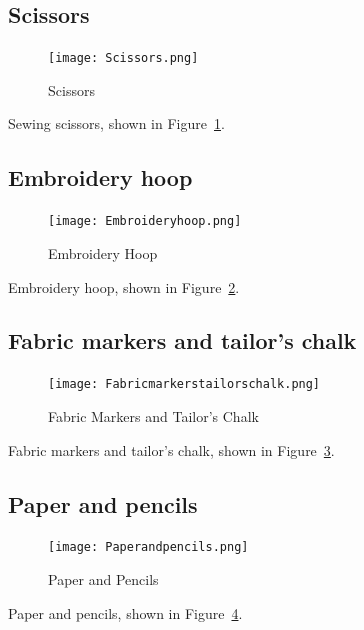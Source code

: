 \documentclass[letterpaper,twoside,12pt]{article}
\begin{document}
\subsection{Scissors}
\begin{figure}[hbpt]\begin{centering}%
\texttt{[image: Scissors.png]}
\caption{Scissors}
\label{fig:scissors}
\end{centering}\end{figure}
Sewing scissors, shown in Figure~\ref{fig:scissors}.
\clearpage
\subsection{Embroidery hoop}
\begin{figure}[hbpt]\begin{centering}%
\texttt{[image: Embroideryhoop.png]}
\caption{Embroidery Hoop}
\label{fig:embroideryhoop}
\end{centering}\end{figure}
Embroidery hoop, shown in Figure~\ref{fig:embroideryhoop}.
\clearpage
\subsection{Fabric markers and tailor's chalk}
\begin{figure}[hbpt]\begin{centering}%
\texttt{[image: Fabricmarkerstailorschalk.png]}
\caption{Fabric Markers and Tailor's Chalk}
\label{fig:fabricmarkerstailorschalk}
\end{centering}\end{figure}
Fabric markers and tailor's chalk, shown in Figure~\ref{fig:fabricmarkerstailorschalk}.
\subsection{Paper and pencils}
\begin{figure}[hbpt]\begin{centering}%
\texttt{[image: Paperandpencils.png]}
\caption{Paper and Pencils}
\label{fig:paperandpencils}
\end{centering}\end{figure}
Paper and pencils, shown in Figure~\ref{fig:paperandpencils}.
\clearpage
\end{document}
